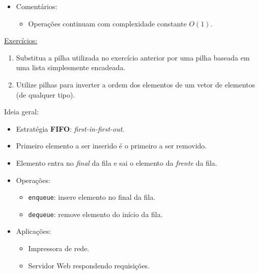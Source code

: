 \medskip

\begin{itemize}
	\color{redtext}
	\item Comentários:
	\begin{itemize}
		\item Operações continuam com complexidade constante $O(1)$.
	\end{itemize}
\end{itemize}

\medskip

\underline{Exercícios:}
\begin{enumerate}
	\item Substitua a pilha utilizada no exercício anterior por uma pilha baseada em uma lista simplesmente encadeada.
	
	\item Utilize pilhas para inverter a ordem dos elementos de um vetor de elementos (de qualquer tipo).
\end{enumerate}

\medskip


Ideia geral:
\begin{itemize}
	\item Estratégia \textbf{FIFO}: \textit{first-in-first-out}.
	\item Primeiro elemento a ser inserido é o primeiro a ser removido.
	\item {\color{redtext}Elemento entra no \textit{final} da fila e sai o elemento da \textit{frente} da fila.}
	\item Operações:
	\begin{itemize}
		\item \texttt{enqueue}: insere elemento no final da fila.
		\item \texttt{dequeue}: remove elemento do início da fila.
	\end{itemize}
	\item Aplicações:
	\begin{itemize}
		\item Impressora de rede.
		\item Servidor Web respondendo requisições.
	\end{itemize}
\end{itemize}

